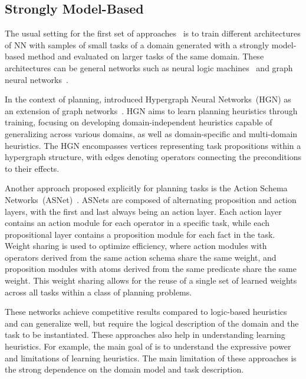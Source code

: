 \subsection{Strongly Model-Based}
\label{sec:related-work-strongly}

The usual setting for the first set of approaches~\cite{toyer2018action,shen2020learning,toyer2020asnets,gehring2022reinforcement,stahlberg2022learning} is to train different architectures of NN with samples of small tasks of a domain generated with a strongly model-based method and evaluated on larger tasks of the same domain. These architectures can be general networks such as neural logic machines~\cite{dong2018neural} and graph neural networks~\cite{gori2005new,scarselli2008graph}.

In the context of planning, \citet{shen2020learning} introduced Hypergraph Neural Networks~(HGN) as an extension of graph networks~\cite{battaglia2018relational}. HGN aims to learn planning heuristics through training, focusing on developing domain-independent heuristics capable of generalizing across various domains, as well as domain-specific and multi-domain heuristics. The HGN encompasses vertices representing task propositions within a hypergraph structure, with edges denoting operators connecting the preconditions to their effects.

Another approach proposed explicitly for planning tasks is the Action Schema Networks~(ASNet)~\cite{toyer2018action}. ASNets are composed of alternating proposition and action layers, with the first and last always being an action layer. Each action layer contains an action module for each operator in a specific task, while each propositional layer contains a proposition module for each fact in the task. Weight sharing is used to optimize efficiency, where action modules with operators derived from the same action schema share the same weight, and proposition modules with atoms derived from the same predicate share the same weight. This weight sharing allows for the reuse of a single set of learned weights across all tasks within a class of planning problems.

These networks achieve competitive results compared to logic-based heuristics and can generalize well, but require the logical description of the domain and the task to be instantiated. These approaches also help in understanding learning heuristics. For example, the main goal of \citet{stahlberg2022learning} is to understand the expressive power and limitations of learning heuristics. The main limitation of these approaches is the strong dependence on the domain model and task description.


